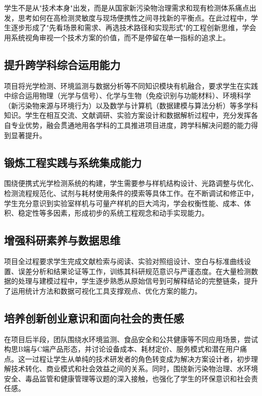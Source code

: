 \documentclass[12pt,a4paper]{article}
\begin{document}
学生不是从"技术本身"出发，而是从国家新污染物治理需求和现有检测体系痛点出发，思考如何在高检测灵敏度与现场便携性之间寻找新的平衡点。在此过程中，学生逐步形成了"先看场景和需求、再选技术路径和实现形式"的工程创新思维，学会用系统视角审视一个技术方案的价值，而不是停留在单一指标的追求上。

\subsection{提升跨学科综合运用能力}

项目将光学检测、环境监测与数据分析等不同知识模块有机融合，要求学生在实践中综合运用物理（光学与信号）、化学与生物（免疫识别与功能材料）、环境科学（新污染物来源与环境行为）以及数学与计算机（数据建模与算法分析）等多学科知识。学生在相互交流、文献调研、实验方案设计和数据解析过程中，充分发挥各自专业优势，融会贯通地用各学科的工具推进项目进度，跨学科解决问题的能力得到显著提升。

\subsection{锻炼工程实践与系统集成能力}

围绕便携式光学检测系统的构建，学生需要参与样机结构设计、光路调整与优化、检测流程规范化、试剂与耗材使用条件的摸索等具体工作。在不断调试和修正中，学生充分意识到实验室样机与可量产样机的巨大鸿沟，学会权衡性能、成本、体积、稳定性等多因素，形成初步的系统工程观念和动手实现能力。

\subsection{增强科研素养与数据思维}

项目全过程要求学生完成文献检索与阅读、实验对照组设计、空白与标准曲线设置、误差分析和结果论证等工作，训练其科研规范意识与严谨态度。在大量检测数据的处理与建模过程中，学生逐步熟悉从原始信号到可解释结论的完整链条，提升了运用统计方法和数据可视化工具支撑观点、优化方案的能力。

\subsection{培养创新创业意识和面向社会的责任感}

在项目后半段，团队围绕水环境监测、食品安全和公共健康等不同应用场景，尝试构思B端与C端产品形态，并讨论设备成本、耗材定价、服务模式和潜在用户痛点。这一过程让学生从单纯的技术研发者的角色转变成为解决方案设计者，初步理解技术转化、商业模式和社会效益之间的关系。同时，围绕新污染物治理、水环境安全、毒品监管和健康管理等议题的深入接触，也强化了学生的环保意识和社会责任感。
\end{document}
